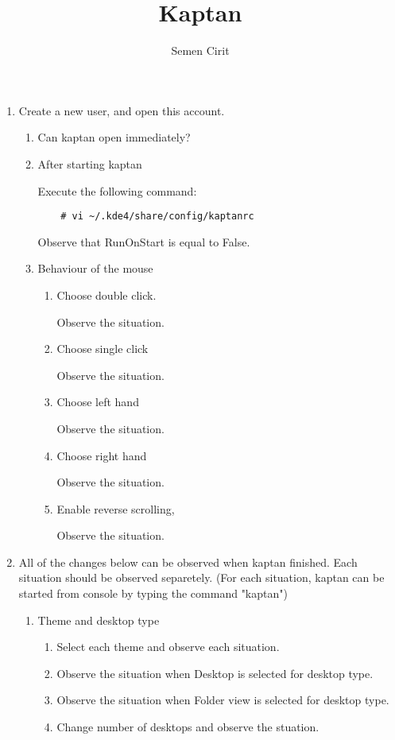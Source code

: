 \documentclass[a4paper,10pt]{article}
\title{Kaptan}
\author{Semen Cirit}
\begin{document}
\maketitle

\begin{enumerate}

\item Create a new user, and open this account.
\begin{enumerate}
    \item Can kaptan open immediately?
    \item After starting kaptan

          Execute the following command:
\begin{verbatim}
    # vi ~/.kde4/share/config/kaptanrc
\end{verbatim} 
        Observe that RunOnStart is equal to False.

    \item Behaviour of the mouse
    \begin{enumerate}
        \item Choose double click.

            Observe the situation.
        \item Choose single click

            Observe the situation.

        \item Choose left hand

            Observe the situation.
        \item Choose right hand

            Observe the situation.

        \item Enable reverse scrolling,

            Observe the situation.
    \end{enumerate}
\end{enumerate}

\item All of the changes below can be observed when kaptan finished. Each situation should be observed separetely.
(For each situation, kaptan can be started from console by typing the command "kaptan")
    \begin{enumerate}
    \item Theme and desktop type
        \begin{enumerate}
        \item Select each theme and observe each situation.
        \item Observe the situation when Desktop is selected for desktop type.
        \item Observe the situation when  Folder view is selected for desktop type.
        \item Change number of desktops and observe the stuation.
        \end{enumerate}


\end{enumerate}
\end{enumerate}
\end{document}
